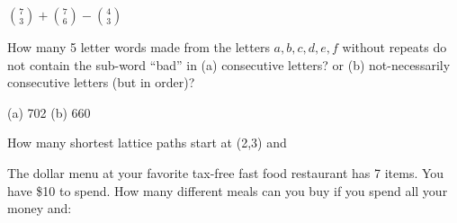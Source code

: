 \begin{squestions}
  \begin{answer}
   ${7 \choose 3} + {7 \choose 6} - {4 \choose 3}$
  \end{answer}


\question How many 5 letter words made from the letters $a,b,c,d,e,f$ without repeats do not contain the sub-word ``bad'' in (a) consecutive letters? or (b) not-necessarily consecutive letters (but in order)? 

  \begin{answer}
   (a) 702  (b) 660
  \end{answer}



\question How many shortest lattice paths start at (2,3) and

  \begin{answer}
  \end{answer}


\question The dollar menu at your favorite tax-free fast food restaurant has 7 items.  You have \$10 to spend. How many different meals can you buy if you spend all your money and: 
\end{squestions}

